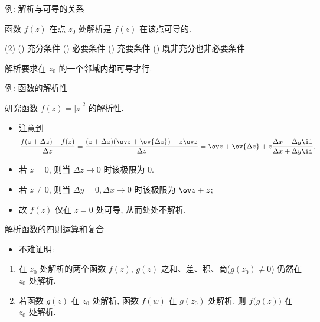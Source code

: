 \begin{frame}{例: 解析与可导的关系}
	\onslide<+->
	\begin{exercise}[nearnext]
		函数 $f(z)$ 在点 $z_0$ 处解析是 $f(z)$ 在该点可导的.
		\begin{exchoice}(2)
			() 充分条件
			() 必要条件
			() 充要条件
			() 既非充分也非必要条件
		\end{exchoice}
	\end{exercise}
	\onslide<+->
	\begin{answer}[nearprev]
		解析要求在 $z_0$ 的一个邻域内都可导才行.
	\end{answer}
\end{frame}


\begin{frame}{例: 函数的解析性}
	\onslide<+->
	\begin{example}[nearnext]
		研究函数 $f(z)=|z|^2$ 的解析性.
	\end{example}

	\onslide<+->
	\begin{solution}[nearprev]
		\begin{itemize}
			\item 注意到
			\[
				\frac{f(z+\Delta z)-f(z)}{\Delta z}
				=\frac{(z+\Delta z)(\ov z+\ov{\Delta z})-z\ov z}{\Delta z}
				=\ov z+\ov{\Delta z}+z\frac{\Delta x-\Delta y\ii}{\Delta x+\Delta y\ii}.
			\]
			\item 若 $z=0$, 则当 $\Delta z\to 0$ 时该极限为 $0$.
			\item 若 $z\neq0$, 则当 $\Delta y=0,\Delta x\to 0$ 时该极限为 $\ov z+z$;
			\onslide<+->{%
			因此此时极限不存在.
			}
			\item 故 $f(z)$ 仅在 $z=0$ 处可导, 从而处处不解析.
		\end{itemize}
	\end{solution}
\end{frame}


\begin{frame}{解析函数的四则运算和复合}
	\begin{itemize}
		\item 不难证明:
	\end{itemize}
	\onslide<+->
	\begin{theorem}
		\begin{enumerate}
			\item 在 $z_0$ 处解析的两个函数 $f(z)$, $g(z)$ 之和、差、积、商($g(z_0)\neq 0$) 仍然在 $z_0$ 处解析.
			\item 若函数 $g(z)$ 在 $z_0$ 处解析, 函数 $f(w)$ 在 $g(z_0)$ 处解析, 则 $f\bigl(g(z)\bigr)$ 在 $z_0$ 处解析.
		\end{enumerate}
	\end{theorem}
\end{frame}



